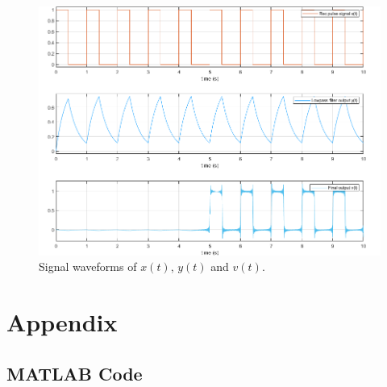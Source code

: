 \documentclass[11pt]{article}
\begin{document}
\begin{enumerate}[label=(\alph*)]
    \begin{figure}[H]
    \centering
        \includegraphics[scale=0.7]{Q3c.png}
        \caption{\label{fig:q3csignals}Signal waveforms of $x(t)$, $y(t)$ and $v(t)$.}
    \end{figure}


\end{enumerate}


\newpage
\section*{Appendix}
\subsection*{MATLAB Code}

\end{document}
